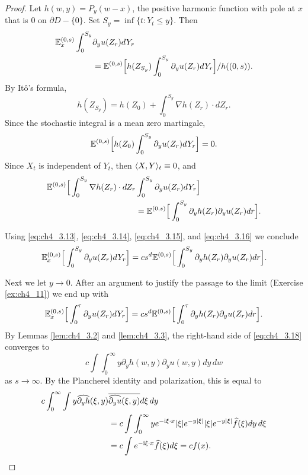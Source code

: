 \begin{proof}
Let $h(w,y) = P_y(w-x)$, the positive harmonic function with pole at $x$ that is $0$ on $\partial D - \{0\}$. Set $S_y = \inf\{t : Y_t \leq y\}$. Then
\mpagebreak
\begin{align}\label{eq:ch4_3.13}
    \mathbb{E}_x^{(0,s)} \int_0^{S_y} &\partial_y u(Z_r)dY_r \\
    &= \mathbb{E}^{(0,s)}\Big[h(Z_{S_y})\int_0^{S_y} \partial_y u(Z_r)dY_r\Big]/h((0,s)). \notag
\end{align}
By It\^o's formula,
\begin{equation}\label{eq:ch4_3.14}
    h(Z_{S_y}) = h(Z_0) + \int_0^{S_y} \nabla h(Z_r)\cdot dZ_r.
\end{equation}
Since the stochastic integral is a mean zero martingale,
\begin{equation}\label{eq:ch4_3.15}
    \mathbb{E}^{(0,s)}\Big[h(Z_0)\int_0^{S_y} \partial_y u(Z_r)dY_r\Big] = 0.
\end{equation}
Since $X_t$ is independent of $Y_t$, then $\langle X,Y \rangle_t \equiv 0$, and
\begin{align}\label{eq:ch4_3.16}
    \mathbb{E}^{(0,s)}\Big[\int_0^{S_y} \nabla h(Z_r)\cdot dZ_r &\int_0^{S_y} \partial_y u(Z_r)dY_r\Big] \\
    &= \mathbb{E}^{(0,s)}\Big[\int_0^{S_y} \partial_y h(Z_r)\partial_y u(Z_r)dr\Big]. \notag
\end{align}

Using \eqref{eq:ch4_3.13}, \eqref{eq:ch4_3.14}, \eqref{eq:ch4_3.15}, and \eqref{eq:ch4_3.16} we conclude
\begin{equation}\label{eq:ch4_3.17}
    \mathbb{E}_x^{(0,s)}\Big[\int_0^{S_y} \partial_y u(Z_r)dY_r\Big] = cs^d\mathbb{E}^{(0,s)}\Big[\int_0^{S_y} \partial_y h(Z_r)\partial_y u(Z_r)dr\Big].
\end{equation}

Next we let $y \to 0$. After an argument to justify the passage to the limit (Exercise \ref{ex:ch4_11}) we end up with
\begin{equation}\label{eq:ch4_3.18}
    \mathbb{E}_x^{(0,s)}\Big[\int_0^{\tau} \partial_y u(Z_r)dY_r\Big] = cs^d\mathbb{E}^{(0,s)}\Big[\int_0^{\tau} \partial_y h(Z_r)\partial_y u(Z_r)dr\Big].
\end{equation}
By Lemmas \ref{lem:ch4_3.2} and \ref{lem:ch4_3.3}, the right-hand side of \eqref{eq:ch4_3.18} converges to
\[
    c\int\int_0^{\infty} y\partial_y h(w,y)\partial_y u(w,y)dy\,dw
\]
as $s \to \infty$. By the Plancherel identity and polarization, this is equal to
\begin{align*}
    c\int_0^{\infty}\int y\widehat{\partial_y h}(\xi,y)&\overline{\widehat{\partial_y u}(\xi,y)}d\xi\,dy \\
    &= c\int\int_0^{\infty} ye^{-\mathrm{i}\xi\cdot x}|\xi|e^{-y|\xi|}|\xi|e^{-y|\xi|}\widehat{f}(\xi)dy\,d\xi \\
\   &= c\int e^{-\mathrm{i}\xi\cdot x}\widehat{f}(\xi)d\xi = cf(x).
\end{align*}
\end{proof}

